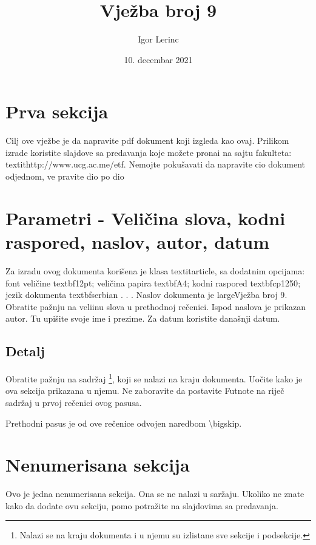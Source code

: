 \documentclass[12pt,a4paper]{article}
\begin{document}
\title{Vje\v{z}ba broj 9}
\author{Igor Lerinc}
\date{10. decembar 2021}
\maketitle

\section{Prva sekcija}
Cilj ove vje\v{z}be je da napravite pdf dokument koji izgleda kao ovaj. Prilikom izrade koristite slajdove sa predavanja koje mo\v{z}ete pronai na sajtu fakulteta: textit{http://www.ucg.ac.me/etf}.
\Large{Nemojte poku\v{s}avati da napravite cio dokument odjednom, ve pravite dio po dio}


\section{\Large{Parametri - Veli\v{c}ina slova, kodni raspored, naslov, autor, datum }}
\label{par}

Za izradu ovog dokumenta kori\v{s}ena je klasa textit{article}, sa dodatnim opcijama: font veli\v{c}ine textbf{12pt}; veli\v{c}ina papira textbf{A4}; kodni raspored textbf{cp1250}; jezik dokumenta textbf{serbian} . . . Naslov dokumenta je large{Vje\v{z}ba broj 9}. Obratite pa\v{z}nju na veliinu slova u prethodnoj re\v{c}enici. Ispod naslova je prikazan autor. Tu upi\v{s}ite svoje ime i prezime. Za datum koristite dana\v{s}nji datum.

\subsection{Detalj}
Obratite pa\v{z}nju na sadr\v{z}aj \footnote{Nalazi se na kraju dokumenta i u njemu su izlistane sve sekcije i podsekcije.}, koji se nalazi na kraju dokumenta. Uo\v{c}ite kako je ova sekcija prikazana u njemu. Ne zaboravite da postavite Futnote na rije\v{c} sadr\v{z}aj u prvoj re\v{c}enici ovog pasusa.
\bigskip

Prethodni pasus je od ove re\v{c}enice odvojen naredbom \textbackslash bigskip.

\section*{Nenumerisana sekcija}
Ovo je jedna nenumerisana sekcija. Ona se ne nalazi u sar\v{z}aju. Ukoliko ne znate kako da dodate ovu sekciju, pomo potra\v{z}ite na slajdovima sa predavanja.
\end{document}
